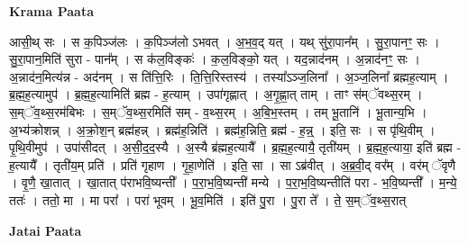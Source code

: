 \documentclass[17pt]{extarticle}
\begin{document}
\textbf{Krama Paata} \newline

आसी॒थ् सः । स क॒पिञ्ज॑लः । क॒पिञ्ज॑लो ऽभवत् । अ॒भ॒व॒द् यत् । यथ् सु॑रा॒पान᳚म् । सु॒रा॒पानꣳ॒॒ सः । सु॒रा॒पान॒मिति॑ सुरा - पान᳚म् । स क॑ल॒विङ्कः॑ । क॒ल॒विङ्को॒ यत् । यद॒न्नाद॑नम् । अ॒न्नाद॑नꣳ॒॒ सः । अ॒न्नाद॑न॒मित्य॑न्न - अद॑नम् । स ति॑त्ति॒रिः । ति॒त्ति॒रिस्तस्य॑ । तस्या᳚ऽञ्ज॒लिना᳚ । अ॒ञ्ज॒लिना᳚ ब्रह्मह॒त्याम् । ब्र॒ह्म॒ह॒त्यामुप॑ । ब्र॒ह्म॒ह॒त्यामिति॑ ब्रह्म - ह॒त्याम् । उपा॑गृह्णात् । अ॒गृ॒ह्णा॒त् ताम् । ताꣳ स॑म्ॅवथ्स॒रम् । स॒म्ॅव॒थ्स॒रम॑बिभः । स॒म्ॅव॒थ्स॒रमिति॑ सम् - व॒थ्स॒रम् । अ॒बि॒भ॒स्तम् । तम् भू॒तानि॑ । भू॒तान्य॒भि । अ॒भ्य॑क्रोशन्न् । अ॒क्रो॒श॒न् ब्रह्म॑हन्न् । ब्रह्म॑ह॒न्निति॑ । ब्रह्म॑ह॒न्निति॒ ब्रह्म॑ - ह॒न्न्॒ । इति॒ सः । स पृ॑थि॒वीम् । पृ॒थि॒वीमुप॑ । उपा॑सीदत् । अ॒सी॒द॒द॒स्यै । अ॒स्यै ब्र॑ह्मह॒त्यायै᳚ । ब्र॒ह्म॒ह॒त्यायै॒ तृती॑यम् । ब्र॒ह्म॒ह॒त्याया॒ इति॑ ब्रह्म - ह॒त्यायै᳚ । तृती॑य॒म् प्रति॑ । प्रति॑ गृहाण । गृ॒हा॒णेति॑ । इति॒ सा । सा ऽब्र॑वीत् । अ॒ब्र॒वी॒द् वर᳚म् । वर॑म् ॅवृणै । वृ॒णै॒ खा॒तात् । खा॒तात् प॑राभवि॒ष्यन्ती᳚ । प॒रा॒भ॒वि॒ष्यन्ती॑ मन्ये । प॒रा॒भ॒वि॒ष्यन्तीति॑ परा - भ॒वि॒ष्यन्ती᳚ । म॒न्ये॒ ततः॑ । ततो॒ मा । मा परा᳚ । परा॑ भूवम् । भू॒व॒मिति॑ । इति॑ पु॒रा । पु॒रा ते᳚ । ते॒ स॒म्ॅव॒थ्स॒रात् \newline

\textbf{Jatai Paata} \newline
\end{document}

